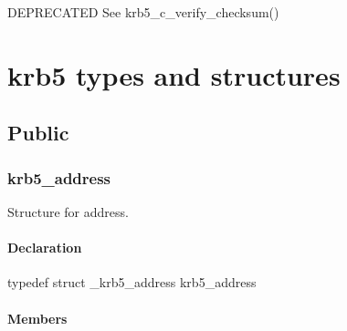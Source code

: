 \documentclass[letterpaper,10pt,english]{sphinxmanual}
\begin{document}
DEPRECATED See krb5\_c\_verify\_checksum()


\section{krb5 types and structures}
\label{appdev/refs/types/index::doc}\label{appdev/refs/types/index:krb5-types-and-structures}

\subsection{Public}
\label{appdev/refs/types/index:public}

\subsubsection{krb5\_address}
\label{appdev/refs/types/krb5_address:krb5-address-struct}\label{appdev/refs/types/krb5_address::doc}\label{appdev/refs/types/krb5_address:krb5-address}

\begin{fulllineitems}
\label{appdev/refs/types/krb5_address:krb5_address}
\end{fulllineitems}


Structure for address.


\paragraph{Declaration}
\label{appdev/refs/types/krb5_address:declaration}
typedef struct \_krb5\_address  krb5\_address


\paragraph{Members}
\label{appdev/refs/types/krb5_address:members}

\begin{fulllineitems}
\label{appdev/refs/types/krb5_address:krb5_address.magic}
\end{fulllineitems}


\begin{fulllineitems}
\label{appdev/refs/types/krb5_address:krb5_address.addrtype}
\end{fulllineitems}
\end{document}
